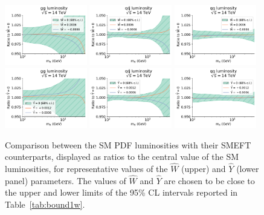 \documentclass[withindex,glossary]{cam-thesis}
\begin{document}
\begin{figure}[t]
\begin{center}
\includegraphics[width=0.32\textwidth]{dy_figures/SMEFTCoef_W_lumi_channels0_plot_lumi1d.pdf}
\includegraphics[width=0.32\textwidth]{dy_figures/SMEFTCoef_W_lumi_channels1_plot_lumi1d.pdf}
\includegraphics[width=0.32\textwidth]{dy_figures/SMEFTCoef_W_lumi_channels2_plot_lumi1d.pdf}
\includegraphics[width=0.32\textwidth]{dy_figures/SMEFTCoef_Y_lumi_channels0_plot_lumi1d.pdf}
\includegraphics[width=0.32\textwidth]{dy_figures/SMEFTCoef_Y_lumi_channels1_plot_lumi1d.pdf}
\includegraphics[width=0.32\textwidth]{dy_figures/SMEFTCoef_Y_lumi_channels2_plot_lumi1d.pdf}
\caption{\label{fig:SMEFT_lumis} 
Comparison between the SM PDF luminosities with their SMEFT counterparts, 
displayed as ratios to the central value of the SM luminosities, 
for representative values of the $\hat{W}$ (upper) and $\hat{Y}$ (lower panel)
parameters.
  The values of $\hat{W}$ and $\hat{Y}$ are chosen to be close 
 to the upper and lower limits of the 95\% CL intervals reported in Table~\ref{tab:bound1w}.}
\end{center}
\end{figure}
\end{document}
